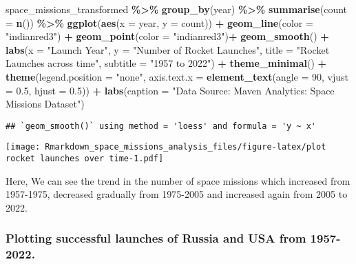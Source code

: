 \documentclass[
]{article}
\newenvironment{Shaded}{\begin{snugshade}}{\end{snugshade}}
\newcommand{\AttributeTok}[1]{\textcolor[rgb]{0.13,0.29,0.53}{#1}}
\newcommand{\DecValTok}[1]{\textcolor[rgb]{0.00,0.00,0.81}{#1}}
\newcommand{\FloatTok}[1]{\textcolor[rgb]{0.00,0.00,0.81}{#1}}
\newcommand{\FunctionTok}[1]{\textcolor[rgb]{0.13,0.29,0.53}{\textbf{#1}}}
\newcommand{\NormalTok}[1]{#1}
\newcommand{\SpecialCharTok}[1]{\textcolor[rgb]{0.81,0.36,0.00}{\textbf{#1}}}
\newcommand{\StringTok}[1]{\textcolor[rgb]{0.31,0.60,0.02}{#1}}
\begin{document}
\begin{Shaded}
\begin{Highlighting}[]
\NormalTok{space\_missions\_transformed }\SpecialCharTok{\%\textgreater{}\%}
  \FunctionTok{group\_by}\NormalTok{(year) }\SpecialCharTok{\%\textgreater{}\%} 
  \FunctionTok{summarise}\NormalTok{(}\AttributeTok{count =} \FunctionTok{n}\NormalTok{()) }\SpecialCharTok{\%\textgreater{}\%} 
  \FunctionTok{ggplot}\NormalTok{(}\FunctionTok{aes}\NormalTok{(}\AttributeTok{x =}\NormalTok{ year, }\AttributeTok{y =}\NormalTok{ count)) }\SpecialCharTok{+}
  \FunctionTok{geom\_line}\NormalTok{(}\AttributeTok{color =} \StringTok{"indianred3"}\NormalTok{) }\SpecialCharTok{+}
  \FunctionTok{geom\_point}\NormalTok{(}\AttributeTok{color =} \StringTok{"indianred3"}\NormalTok{)}\SpecialCharTok{+}
  \FunctionTok{geom\_smooth}\NormalTok{() }\SpecialCharTok{+}
  \FunctionTok{labs}\NormalTok{(}\AttributeTok{x =} \StringTok{"Launch Year"}\NormalTok{, }
       \AttributeTok{y =} \StringTok{"Number of Rocket Launches"}\NormalTok{, }
       \AttributeTok{title =} \StringTok{"Rocket Launches across time"}\NormalTok{,}
       \AttributeTok{subtitle =} \StringTok{"1957 to 2022"}\NormalTok{) }\SpecialCharTok{+}
  \FunctionTok{theme\_minimal}\NormalTok{() }\SpecialCharTok{+}
  \FunctionTok{theme}\NormalTok{(}\AttributeTok{legend.position =} \StringTok{"none"}\NormalTok{,}
        \AttributeTok{axis.text.x =} \FunctionTok{element\_text}\NormalTok{(}\AttributeTok{angle =} \DecValTok{90}\NormalTok{, }\AttributeTok{vjust =} \FloatTok{0.5}\NormalTok{, }\AttributeTok{hjust =} \FloatTok{0.5}\NormalTok{)) }\SpecialCharTok{+}
  \FunctionTok{labs}\NormalTok{(}\AttributeTok{caption =} \StringTok{"Data Source: Maven Analytics: Space Missions Dataset"}\NormalTok{)}
\end{Highlighting}
\end{Shaded}

\begin{verbatim}
## `geom_smooth()` using method = 'loess' and formula = 'y ~ x'
\end{verbatim}

\texttt{[image: Rmarkdown\_space\_missions\_analysis\_files/figure-latex/plot rocket launches over time-1.pdf]}

Here, We can see the trend in the number of space missions which
increased from 1957-1975, decreased gradually from 1975-2005 and
increased again from 2005 to 2022.

\hypertarget{plotting-successful-launches-of-russia-and-usa-from-1957-2022.}{%
\subsubsection{Plotting successful launches of Russia and USA from
1957-2022.}\label{plotting-successful-launches-of-russia-and-usa-from-1957-2022.}}
\end{document}
